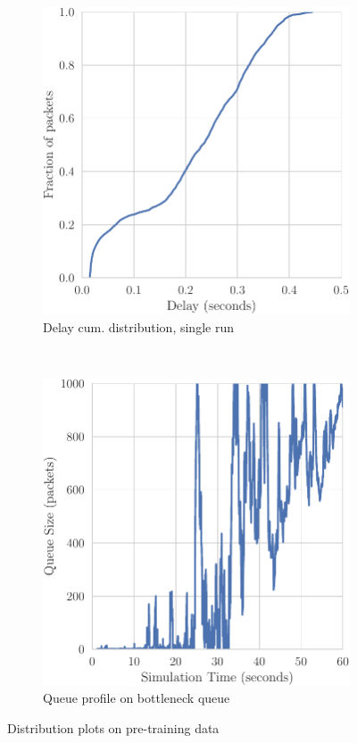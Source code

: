 \begin{figure}[h]
    \centering
    \begin{subfigure}[h]{0.5\textwidth}
        \centering
        \includegraphics[scale=0.65]{figures/delay.pdf}
        \caption{Delay cum. distribution, single run}
    \end{subfigure}%
    ~ 
    \begin{subfigure}[h]{0.5\textwidth}
        \centering
        \includegraphics[scale=0.65]{figures/queue_profile_A.pdf}
        \caption{Queue profile on bottleneck queue}
    \end{subfigure}
    \caption{Distribution plots on pre-training data}
    \label{fig:datadist}
\end{figure}


